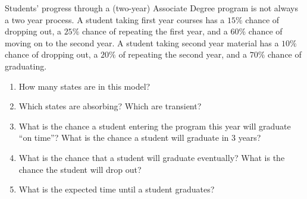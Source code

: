 \documentclass[12pt]{article}
\begin{document}
\begin{exercise}
    Students' progress through a (two-year) Associate Degree program is
    not always a two year process.  A student taking first year courses
    has a \( 15\% \) chance of dropping out, a \( 25\% \) chance of
    repeating the first year, and a \( 60\% \) chance of moving on to
    the second year.  A student taking second year material has a \( 10\%
    \) chance of dropping out, a \( 20\% \) of repeating the second
    year, and a \( 70\% \) chance of graduating.
    \begin{enumerate}[label=(\alph*)]
    \item
        How many states are in this model?
    \item
        Which states are absorbing?  Which are transient?
    \item
        What is the chance a student entering the program this year will
        graduate ``on time''?  What is the chance a student will
        graduate in 3 years?
    \item
        What is the chance that a student will graduate eventually?
        What is the chance the student will drop out?
    \item
        What is the expected time until a student graduates?
\end{enumerate}
\end{exercise}
\end{document}
